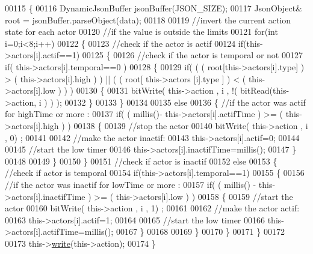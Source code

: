 \begin{DoxyCode}
00115 \{
00116     DynamicJsonBuffer jsonBuffer(JSON\_SIZE);
00117     JsonObject& root = jsonBuffer.parseObject(data);
00118     
00119     \textcolor{comment}{//invert the current action state for each actor}
00120     \textcolor{comment}{//if the value is outside the limits}
00121     \textcolor{keywordflow}{for}(\textcolor{keywordtype}{int} i=0;i<8;i++)
00122     \{
00123         \textcolor{comment}{//check if the actor is actif }
00124         \textcolor{keywordflow}{if}(this->actors[i].actif==1)
00125         \{   
00126             \textcolor{comment}{//check if the actor is temporal or not}
00127             \textcolor{keywordflow}{if}( this->actors[i].temporal==0 ) 
00128             \{
00129                 \textcolor{keywordflow}{if}( ( ( root[this->actors[i].type] ) > ( this->actors[i].high ) ) || ( ( root[ this->actors
      [i].type ] ) < ( this->actors[i].low ) ) )   
00130                 \{   
00131                     bitWrite( this->action , i , !( bitRead(this->action, i ) ) );  
00132                 \}
00133             \}
00134 
00135             \textcolor{keywordflow}{else}
00136             \{   \textcolor{comment}{//if the actor was actif for highTime or more :}
00137                 \textcolor{keywordflow}{if}( ( millis()- this->actors[i].actifTime  ) >= ( this->actors[i].high  ) )
00138                 \{
00139                     \textcolor{comment}{//stop the actor}
00140                     bitWrite( this->action , i , 0) ;
00141 
00142                     \textcolor{comment}{//make the actor inactif:}
00143                     this->actors[i].actif=0;
00144 
00145                     \textcolor{comment}{//start the low timer}
00146                     this->actors[i].inactifTime=millis();               
00147                 \}           
00148                             
00149             \}
00150         \}
00151         \textcolor{comment}{//check if actor is inactif}
00152         \textcolor{keywordflow}{else}
00153         \{   \textcolor{comment}{//check if actor is temporal}
00154             \textcolor{keywordflow}{if}(this->actors[i].temporal==1)
00155             \{
00156                 \textcolor{comment}{//if the actor was inactif for lowTime or more :}
00157                 \textcolor{keywordflow}{if}( ( millis() - this->actors[i].inactifTime ) >= ( this->actors[i].low  ) )
00158                 \{
00159                     \textcolor{comment}{//start the actor}
00160                     bitWrite( this->action , i , 1) ;
00161 
00162                     \textcolor{comment}{//make the actor actif:}
00163                     this->actors[i].actif=1;
00164 
00165                     \textcolor{comment}{//start the low timer}
00166                     this->actors[i].actifTime=millis();             
00167                 \}           
00168             
00169             \}
00170         \}
00171     \}
00172 
00173     this->\hyperlink{class_jetpack_a338f1af8cbc6504ac69b47c7328569b5}{write}(this->action);
00174 \}
\end{DoxyCode}
